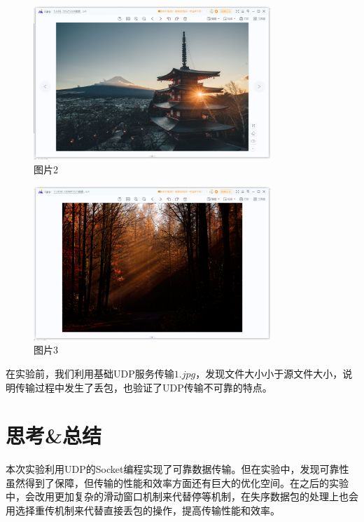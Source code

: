 \documentclass[UTF8,a4paper,10pt]{ctexart}
\begin{document}
\begin{figure}[H]
    \centering
\includegraphics[width=0.8\textwidth]{img/图片2.png}
    \caption{图片2}
\end{figure}
\begin{figure}[H]
    \centering
\includegraphics[width=0.8\textwidth]{img/图片3.png}
    \caption{图片3}
\end{figure}
在实验前，我们利用基础UDP服务传输$1.jpg$，发现文件大小小于源文件大小，说明传输过程中发生了丢包，也验证了UDP传输不可靠的特点。
\section{思考\&总结}
本次实验利用UDP的Socket编程实现了可靠数据传输。但在实验中，发现可靠性虽然得到了保障，但传输的性能和效率方面还有巨大的优化空间。在之后的实验中，会改用更加复杂的滑动窗口机制来代替停等机制，在失序数据包的处理上也会用选择重传机制来代替直接丢包的操作，提高传输性能和效率。
\end{document}
